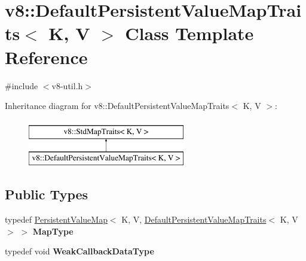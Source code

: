 \hypertarget{classv8_1_1DefaultPersistentValueMapTraits}{}\section{v8\+:\+:Default\+Persistent\+Value\+Map\+Traits$<$ K, V $>$ Class Template Reference}
\label{classv8_1_1DefaultPersistentValueMapTraits}


{\ttfamily \#include $<$v8-\/util.\+h$>$}

Inheritance diagram for v8\+:\+:Default\+Persistent\+Value\+Map\+Traits$<$ K, V $>$\+:\begin{figure}[H]
\begin{center}
\leavevmode
\includegraphics[height=2.000000cm]{classv8_1_1DefaultPersistentValueMapTraits}
\end{center}
\end{figure}
\subsection*{Public Types}
\begin{DoxyCompactItemize}
\item 
\hypertarget{classv8_1_1DefaultPersistentValueMapTraits_a05cbd536d6bb9ba4949198351e074854}{}typedef \hyperlink{classv8_1_1PersistentValueMap}{Persistent\+Value\+Map}$<$ K, V, \hyperlink{classv8_1_1DefaultPersistentValueMapTraits}{Default\+Persistent\+Value\+Map\+Traits}$<$ K, V $>$ $>$ {\bfseries Map\+Type}\label{classv8_1_1DefaultPersistentValueMapTraits_a05cbd536d6bb9ba4949198351e074854}

\item 
\hypertarget{classv8_1_1DefaultPersistentValueMapTraits_a379f8c42e727a9576fb0954bb0245d8f}{}typedef void {\bfseries Weak\+Callback\+Data\+Type}\label{classv8_1_1DefaultPersistentValueMapTraits_a379f8c42e727a9576fb0954bb0245d8f}

\end{DoxyCompactItemize}
